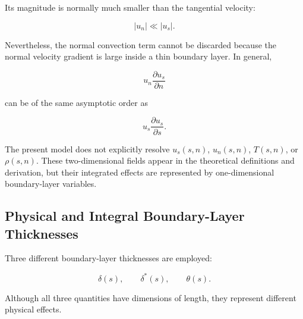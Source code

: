 Its magnitude is normally much smaller than the tangential velocity:

\begin{equation}
    |u_n|\ll|u_s|.
    \label{eq:BL_velocity_scaling}
\end{equation}

Nevertheless, the normal convection term cannot be discarded because the
normal velocity gradient is large inside a thin boundary layer. In general,

\begin{equation}
    u_n\frac{\partial u_s}{\partial n}
\end{equation}

can be of the same asymptotic order as

\begin{equation}
    u_s\frac{\partial u_s}{\partial s}.
\end{equation}

The present model does not explicitly resolve
\(u_s(s,n)\), \(u_n(s,n)\), \(T(s,n)\), or \(\rho(s,n)\). These
two-dimensional fields appear in the theoretical definitions and derivation,
but their integrated effects are represented by one-dimensional
boundary-layer variables.

\subsection{Physical and Integral Boundary-Layer Thicknesses}

Three different boundary-layer thicknesses are employed:

\begin{equation}
    \boxed{
    \delta(s),\qquad
    \delta^*(s),\qquad
    \theta(s)
    }.
\end{equation}

Although all three quantities have dimensions of length, they represent
different physical effects.

